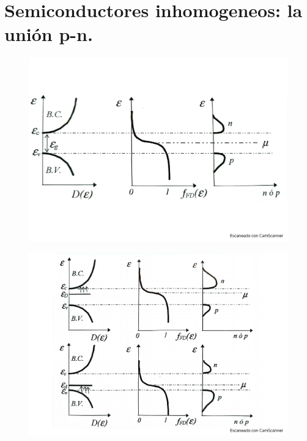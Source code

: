 \section{Semiconductores inhomogeneos: la unión p-n.}
\begin{figure}[h!] \centering
	\includegraphics[scale=0.5]{Cuerpo/Ch_09/Fotos libro 2.pdf}
	\caption{}
	\label{Fig:09-02}
\end{figure}
\begin{figure}[h!] \centering
	\includegraphics[scale=0.5]{Cuerpo/Ch_09/Fotos libro 3.pdf}
	\caption{}
	\label{Fig:09-03}
\end{figure}
